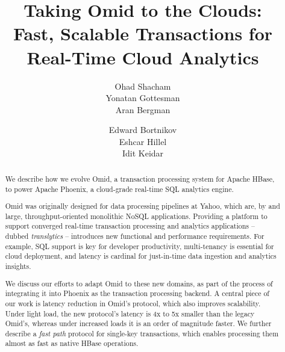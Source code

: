 \documentclass{vldb}
\begin{document}
\date{}

\title{Taking Omid to the Clouds: \\ 
Fast,  Scalable Transactions for Real-Time Cloud Analytics }

\author{
\alignauthor
Ohad Shacham\\
       \email{}
\alignauthor
Yonatan Gottesman\\ %
       \email{}
\alignauthor
Aran Bergman\\
       \email{}
\and
\alignauthor
Edward Bortnikov\\
       \email{}
\alignauthor
Eshcar Hillel\\
       \email{}
\alignauthor
Idit Keidar\\
       \email{}
} %


\maketitle



\begin{abstract}


We describe how we evolve Omid, a transaction processing system for Apache HBase, 
to power Apache Phoenix, a cloud-grade real-time SQL analytics engine.  

Omid was originally designed for data processing pipelines at Yahoo, which are, by and large, 
throughput-oriented monolithic NoSQL applications. 
Providing a platform 
to support 
converged real-time transaction processing and analytics applications --
dubbed {\em translytics} --  
introduces new functional and performance requirements. For example, SQL 
support is key for developer productivity, multi-tenancy is essential for cloud deployment, 
and latency is cardinal for just-in-time data ingestion and analytics insights.

We discuss our efforts to adapt Omid to these new domains, 
as part of 
the process of integrating it into Phoenix as the transaction processing backend. A central piece
of our work is latency reduction in Omid's protocol, which also improves  scalability.  
Under light load, the new protocol's latency is 4x to 5x smaller than the legacy Omid's, whereas 
under increased loads it is an order of magnitude faster. We further describe a \emph{fast path} 
protocol for single-key transactions, which enables processing them almost as fast 
as native HBase operations.

\end{abstract}
\end{document}
